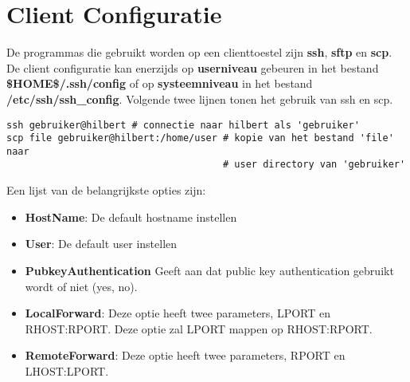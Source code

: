 \documentclass{report}
\begin{document}
	\section{Client Configuratie}
	\label{sec:client_config}
	De programmas die gebruikt worden op een clienttoestel zijn \textbf{ssh}, \textbf{sftp} en \textbf{scp}. De client configuratie kan enerzijds op \textbf{userniveau} gebeuren in het bestand \textbf{\$HOME\$/.ssh/config} of op \textbf{systeemniveau} in het bestand \textbf{/etc/ssh/ssh\_config}. Volgende twee lijnen tonen het gebruik van ssh en scp.
	\begin{lstlisting}
ssh gebruiker@hilbert # connectie naar hilbert als 'gebruiker'
scp file gebruiker@hilbert:/home/user # kopie van het bestand 'file' naar
                                      # user directory van 'gebruiker'	
	\end{lstlisting}
	Een lijst van de belangrijkste opties zijn:
	\begin{itemize}
		\item \textbf{HostName}: De default hostname instellen
		\item \textbf{User}: De default user instellen
		\item \textbf{PubkeyAuthentication} Geeft aan dat public key authentication gebruikt wordt of niet (yes, no).
		\item \textbf{LocalForward}: Deze optie heeft twee parameters, LPORT en RHOST:RPORT. Deze optie zal LPORT mappen op RHOST:RPORT.
		\item \textbf{RemoteForward}: Deze optie heeft twee parameters, RPORT en LHOST:LPORT.
	\end{itemize}
	
\end{document}
